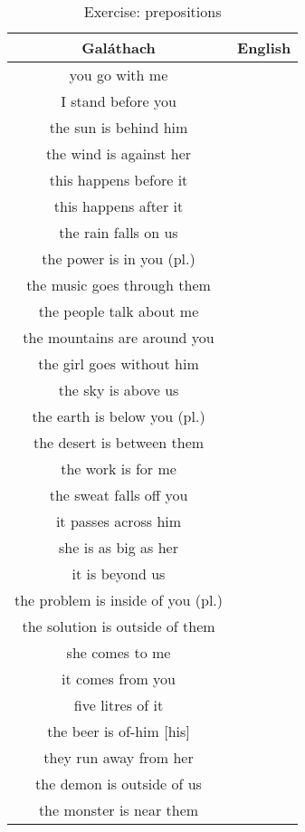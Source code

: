 \begin{table}[H]
\centering
\begin{tabular}{|c|M{5.0cm}|}
  \toprule
  \textbf{Gal\'{a}thach} & \textbf{English}\\
  \toprule
  you go with me & \\
  \midrule
  I stand before you & \\
  \midrule
  the sun is behind him & \\
  \midrule
  the wind is against her & \\
  \midrule
  this happens before it & \\
  \midrule
  this happens after it & \\
  \midrule
  the rain falls on us & \\
  \midrule
  the power is in you (pl.) & \\
  \midrule
  the music goes through them & \\
  \midrule
  the people talk about me & \\
  \midrule
  the mountains are around you & \\
  \midrule
  the girl goes without him & \\
  \midrule
  the sky is above us & \\
  \midrule
  the earth is below you (pl.) & \\
  \midrule
  the desert is between them & \\
  \midrule
  the work is for me & \\
  \midrule
  the sweat falls off you & \\
  \midrule
  it passes across him & \\
  \midrule
  she is as big as her & \\
  \midrule
  it is beyond us & \\
  \midrule
  the problem is inside of you (pl.) & \\
  \midrule
  the solution is outside of them & \\
  \midrule
  she comes to me & \\
  \midrule
  it comes from you & \\
  \midrule
  five litres of it & \\
  \midrule
  the beer is of-him $[$his$]$ & \\
  \midrule
  they run away from her & \\
  \midrule
  the demon is outside of us & \\
  \midrule
  the monster is near them & \\
  \bottomrule
\end{tabular}
\label{exercise_prepositions}
\caption{Exercise: prepositions}
\end{table}

